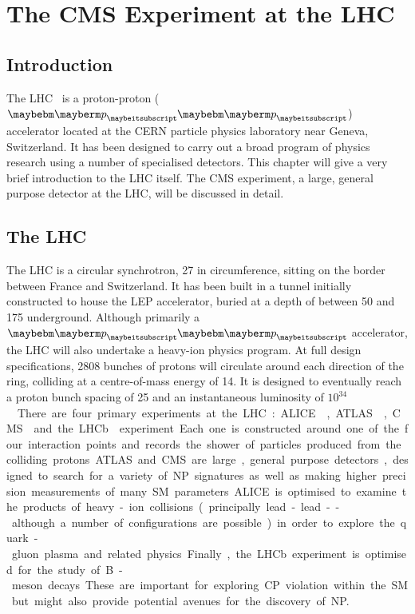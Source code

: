 \chapter{The \acl{CMS} Experiment at the \acl{LHC}}
\label{sec:experiment}
\section{Introduction}
The \acf{LHC}~\cite{lhc_design_report} is a proton-proton ($\Pp\Pp$) accelerator
located at the CERN particle physics laboratory near Geneva, Switzerland. It has
been designed to carry out a broad program of physics research using a number of
specialised detectors. This chapter will give a very brief introduction to the
\ac{LHC} itself. The \acf{CMS} experiment, a large, general purpose detector at
the \ac{LHC}, will be discussed in detail.

\section{The \acl{LHC}}
The \ac{LHC} is a circular synchrotron, \unit{27}{\kilo\metre} in circumference,
sitting on the border between France and Switzerland. It has been built in a
tunnel initially constructed to house the \ac{LEP} accelerator, buried at a
depth of between 50 and \unit{175}{\metre} underground. Although primarily a
$\Pp\Pp$ accelerator, the \ac{LHC} will also undertake a heavy-ion physics
program. At full design specifications, 2808 bunches of protons will circulate
around each direction of the ring, colliding at a centre-of-mass energy of
\unit{14}{\TeV}. It is designed to eventually reach a proton bunch spacing of
\unit{25}{\ns} and an instantaneous luminosity of
\unit{$10^{34}$}{\rpsquare{\centi\metre}\usk\reciprocal\second}.

There are four primary experiments at the \ac{LHC}:
\ac{ALICE}~\cite{alice_proposal}, \ac{ATLAS}~\cite{atlas_proposal},
\ac{CMS}~\cite{cms_technical_proposal,cms_jinst} and the
\ac{LHCb}~\cite{lhcb_proposal} experiment. Each one is constructed around one of
the four interaction points and records the shower of particles produced from
the colliding protons. \ac{ATLAS} and \ac{CMS} are large, general purpose
detectors, designed to search for a variety of \ac{NP} signatures as well as
making higher precision measurements of many \ac{SM} parameters. \ac{ALICE} is
optimised to examine the products of heavy-ion collisions (principally lead-lead
-- although a number of configurations are possible) in order to explore the
quark-gluon plasma and related physics. Finally, the \ac{LHCb} experiment is
optimised for the study of B-meson decays. These are important for exploring
CP violation within the \ac{SM} but might also provide potential avenues for the
discovery of \ac{NP}.


